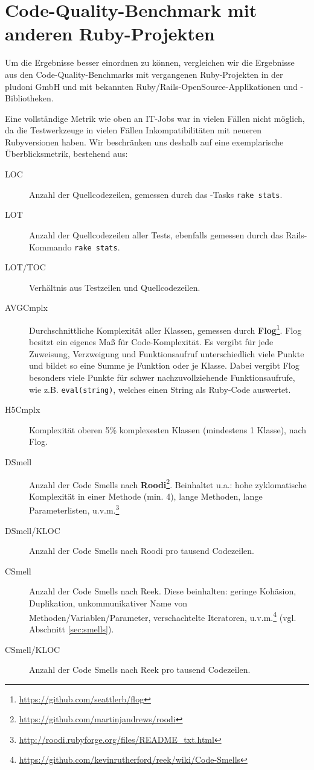\section{Code-Quality-Benchmark mit anderen Ruby-Projekten}
\label{sec:benchmarkAll}

Um die Ergebnisse besser einordnen zu können, vergleichen wir die Ergebnisse aus den Code-Quality-Benchmarks mit vergangenen Ruby-Projekten in der pludoni GmbH und mit bekannten Ruby/Rails-OpenSource-Applikationen und -Bibliotheken.

Eine vollständige Metrik wie oben an IT-Jobs war in vielen Fällen nicht möglich, da die Testwerkzeuge in vielen Fällen Inkompatibilitäten mit neueren Rubyversionen haben. Wir beschränken uns deshalb auf eine exemplarische Überblicksmetrik, bestehend aus:

\begin{description}
 \item[LOC] Anzahl der Quellcodezeilen, gemessen durch das -Tasks \texttt{rake stats}.
 \item[LOT] Anzahl der Quellcodezeilen aller Tests, ebenfalls gemessen durch das Rails-Kommando \texttt{rake stats}.
 \item[LOT/TOC] Verhältnis aus Testzeilen und Quellcodezeilen.
 \item[AVGCmplx] Durchschnittliche Komplexität aller Klassen, gemessen durch \textbf{Flog}\footnote{\url{https://github.com/seattlerb/flog}}. Flog besitzt ein eigenes Maß für Code-Komplexität. Es vergibt für jede Zuweisung, Verzweigung und Funktionsaufruf unterschiedlich viele Punkte und bildet so eine Summe je Funktion oder je Klasse. Dabei vergibt Flog besonders viele Punkte für schwer nachzuvollziehende Funktionsaufrufe, wie z.B. \texttt{eval(string)}, welches einen String als Ruby-Code auswertet.
 \item[H5Cmplx] Komplexität oberen 5\% komplexesten Klassen (mindestens 1 Klasse), nach Flog.
 \item[DSmell] Anzahl der Code Smells nach \textbf{Roodi}\footnote{\url{https://github.com/martinjandrews/roodi}}. Beinhaltet u.a.: hohe zyklomatische Komplexität in einer Methode (min. 4), lange Methoden, lange Parameterlisten, u.v.m.\footnote{\url{http://roodi.rubyforge.org/files/README_txt.html}}
 \item[DSmell/KLOC] Anzahl der Code Smells nach Roodi pro tausend Codezeilen.
 \item[CSmell] Anzahl der Code Smells nach Reek. Diese beinhalten: geringe Kohäsion, Duplikation, unkommunikativer Name von Methoden/Variablen/Parameter, verschachtelte Iteratoren, u.v.m.\footnote{\url{https://github.com/kevinrutherford/reek/wiki/Code-Smells}} (vgl. Abschnitt \ref{sec:smells}).
 \item[CSmell/KLOC] Anzahl der Code Smells nach Reek pro tausend Codezeilen.
\end{description}







